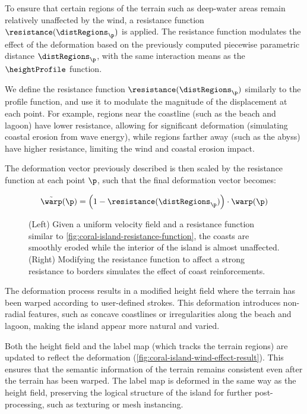 To ensure that certain regions of the terrain such as deep-water areas remain relatively unaffected by the wind, a resistance function $\resistance(\distRegions_\p)$ is applied. The resistance function modulates the effect of the deformation based on the previously computed piecewise parametric distance $\distRegions_\p$, with the same interaction means as the $\heightProfile$ function.

We define the resistance function $\resistance(\distRegions_\p)$ similarly to the profile function, and use it to modulate the magnitude of the displacement at each point. For example, regions near the coastline (such as the beach and lagoon) have lower resistance, allowing for significant deformation (simulating coastal erosion from wave energy), while regions farther away (such as the abyss) have higher resistance, limiting the wind and coastal erosion impact.

The deformation vector previously described is then scaled by the resistance function at each point $\p$, such that the final deformation vector becomes:

\begin{align}
    \Tilde{\warp}(\p) = \left(1 - \resistance(\distRegions_\p) \right) \cdot \warp(\p)
\end{align}

\begin{figure}
    \caption{(Left) Given a uniform velocity field and a resistance function similar to \cref{fig:coral-island-resistance-function}, the coasts are smoothly eroded while the interior of the island is almost unaffected. (Right) Modifying the resistance function to affect a strong resistance to borders simulates the effect of coast reinforcements.}
    \label{fig:coral-island-strong-low-resistance}
\end{figure}

The deformation process results in a modified height field where the terrain has been warped according to user-defined strokes. This deformation introduces non-radial features, such as concave coastlines or irregularities along the beach and lagoon, making the island appear more natural and varied.

Both the height field and the label map (which tracks the terrain regions) are updated to reflect the deformation (\cref{fig:coral-island-wind-effect-result}). This ensures that the semantic information of the terrain remains consistent even after the terrain has been warped. The label map is deformed in the same way as the height field, preserving the logical structure of the island for further post-processing, such as texturing or mesh instancing.

